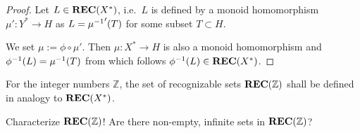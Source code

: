 \begin{proof}
Let $L \in \mbox{{\bf REC}}(X^*)$, i.e.\ $L$ is defined by a monoid homomorphism
$\mu' : Y^* \to H$ as $L = {{\mu}^{-1}}'(T)$ for some subset $T \subset H$.

We set $\mu := \phi \circ \mu'$. Then $\mu : X^* \to H$ is also a monoid
homomorphism and ${{\phi}^{-1}}(L) = {{\mu}^{-1}}(T)$ from which follows ${{\phi}^{-1}}(L)
\in \mbox{{\bf REC}}(X^*)$.
\end{proof}

\bigskip
\begin{exercise}
For the integer numbers $\mathbb{Z}$, the set of recognizable sets
$\mbox{{\bf REC}}(\mathbb{Z})$ shall be defined in analogy to $\mbox{{\bf REC}}(X^*)$.

Characterize $\mbox{{\bf REC}}(\mathbb{Z})$! Are there non-empty, infinite sets in
$\mbox{{\bf REC}}(\mathbb{Z})$?
\end{exercise}
